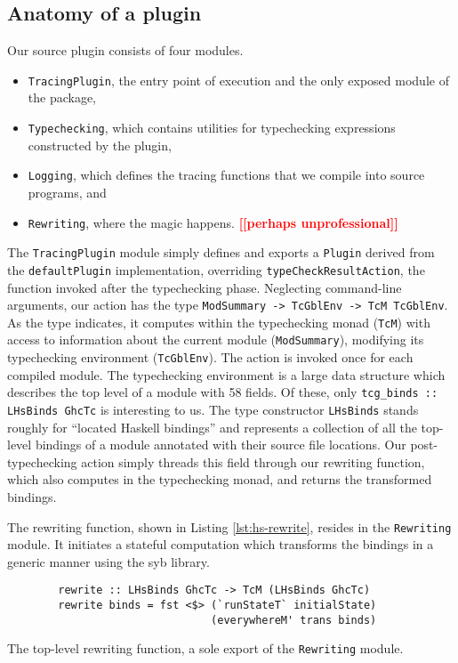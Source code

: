 \documentclass[thesis=B,english]{FITthesis}[2019/12/23]
\newcommand{\todo}[1]{\textcolor{red}{\textbf{[[#1]]}}}
\newcommand{\hsType}[1]{\texttt{#1}}
\newcommand{\hsIdent}[1]{\texttt{#1}}
\newcommand{\hsModule}[1]{\texttt{#1}}
\newcommand{\hsCode}[1]{\texttt{#1}}
\begin{document}
\subsection*{Anatomy of a plugin}
Our source plugin consists of four modules.
\begin{itemize}
	\item \hsModule{TracingPlugin}, the entry point of execution and the only
		exposed module of the package,
	\item \hsModule{Typechecking}, which contains utilities for typechecking
		expressions constructed by the plugin,
	\item \hsModule{Logging}, which defines the tracing functions that we
		compile into source programs, and
	\item \hsModule{Rewriting}, where the magic happens. \todo{perhaps
		unprofessional}
\end{itemize}

The \hsModule{TracingPlugin} module simply defines and exports a
\hsType{Plugin} derived from the \hsIdent{defaultPlugin} implementation,
overriding \hsIdent{typeCheckResultAction}, the function invoked after the
typechecking phase. Neglecting command-line arguments, our action has the type
\hsType{ModSummary -> TcGblEnv -> TcM TcGblEnv}. As the type indicates, it
computes within the typechecking monad (\hsType{TcM}) with access to
information about the current module (\hsType{ModSummary}), modifying its
typechecking environment (\hsType{TcGblEnv}). The action is invoked once for
each compiled module. The typechecking environment is a large data structure
which describes the top level of a module with 58 fields. Of these, only
\hsCode{tcg_binds :: LHsBinds GhcTc} is interesting to us. The type
constructor \hsType{LHsBinds} stands roughly for ``located Haskell bindings''
and represents a collection of all the top-level bindings of a module annotated
with their source file locations. Our post-typechecking action simply threads
this field through our rewriting function, which also computes in the
typechecking monad, and returns the transformed bindings.

The rewriting function, shown in Listing \ref{lst:hs-rewrite}, resides in the
\hsModule{Rewriting} module. It initiates a stateful computation which
transforms the bindings in a generic manner using the \acrshort{syb} library.
\begin{listing}[h]
	\centering
	\begin{verbatim}
        rewrite :: LHsBinds GhcTc -> TcM (LHsBinds GhcTc)
        rewrite binds = fst <$> (`runStateT` initialState)
                                (everywhereM' trans binds)
	\end{verbatim}
	\caption[The top-level rewriting function.]{The top-level rewriting
	function, a sole export of the \hsModule{Rewriting} module.}
	\label{lst:hs-rewrite}
\end{listing}
\end{document}
